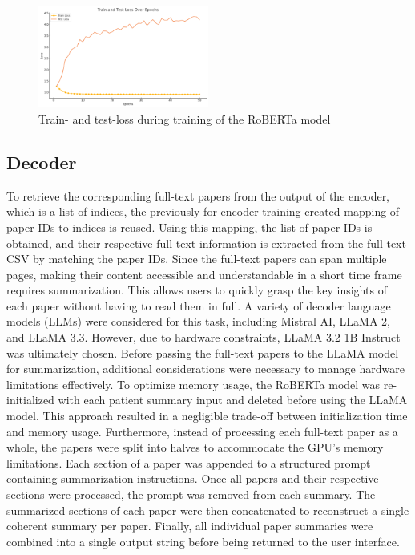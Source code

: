 \begin{figure}[hbt!]
    \centering
    \includegraphics[width=0.5\textwidth]{fig/loss.png}
    \caption{Train- and test-loss during training of the RoBERTa model}
    \label{fig:loss}
\end{figure}\noindent 

\subsection{Decoder}
To retrieve the corresponding full-text papers from the output of the encoder, which is a list of indices, the previously for encoder training created mapping of paper IDs to indices is reused. Using this mapping, the list of paper IDs is obtained, and their respective full-text information is extracted from the full-text CSV by matching the paper IDs.
Since the full-text papers can span multiple pages, making their content accessible and understandable in a short time frame requires summarization. This allows users to quickly grasp the key insights of each paper without having to read them in full.
A variety of decoder language models (LLMs) were considered for this task, including Mistral AI, LLaMA 2, and LLaMA 3.3. However, due to hardware constraints, LLaMA 3.2 1B Instruct was ultimately chosen. Before passing the full-text papers to the LLaMA model for summarization, additional considerations were necessary to manage hardware limitations effectively.
To optimize memory usage, the RoBERTa model was re-initialized with each patient summary input and deleted before using the LLaMA model. This approach resulted in a negligible trade-off between initialization time and memory usage. Furthermore, instead of processing each full-text paper as a whole, the papers were split into halves to accommodate the GPU's memory limitations.
Each section of a paper was appended to a structured prompt containing summarization instructions. Once all papers and their respective sections were processed, the prompt was removed from each summary. The summarized sections of each paper were then concatenated to reconstruct a single coherent summary per paper. Finally, all individual paper summaries were combined into a single output string before being returned to the user interface.

